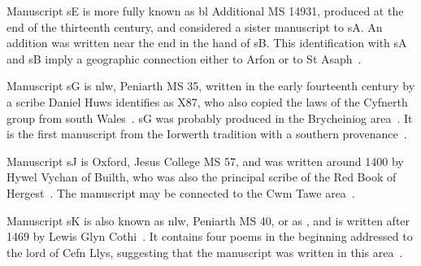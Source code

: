 Manuscript \gls{sE} is more fully known as \gls{bl} Additional MS 14931,  produced at the end of the thirteenth century, and  considered a sister manuscript to \gls{sA}. An addition was written near the end in the hand of \gls{sB}. This identification with \gls{sA} and \gls{sB} imply a geographic connection either to Arfon or to St Asaph~\autocite[100]{charles-edwards_welsh_1989}.

Manuscript \gls{sG} is \gls{nlw}, Peniarth MS 35, written in the early fourteenth century by a scribe  Daniel Huws identifies as X87, who also copied the laws of the Cyfnerth group from south Wales~\autocite{smith_tei_2013}. \Gls{sG} was probably produced in the Brycheiniog area~\autocite[v]{elias_golygiad_2007}. It is the first manuscript from the Iorwerth tradition with a southern provenance~\autocite{charles-edwards_introduction_1986}.

Manuscript \gls{sJ} is Oxford, Jesus College MS 57, and was written around 1400 by Hywel Vychan of Builth, who was also the principal scribe of the Red Book of Hergest~\autocite[100]{charles-edwards_welsh_1989}. The manuscript may be connected to the Cwm Tawe area~\autocite{james_llwyr_1993}.

Manuscript \gls{sK} is also known as \gls{nlw}, Peniarth MS 40, or as , and is written after 1469 by Lewis Glyn Cothi~\autocite{roberts_cyfraith_2011}. It contains four poems in the beginning addressed to the lord of Cefn Llys, suggesting that the manuscript was written in this area~\autocite[374]{evans_report_1899}.

